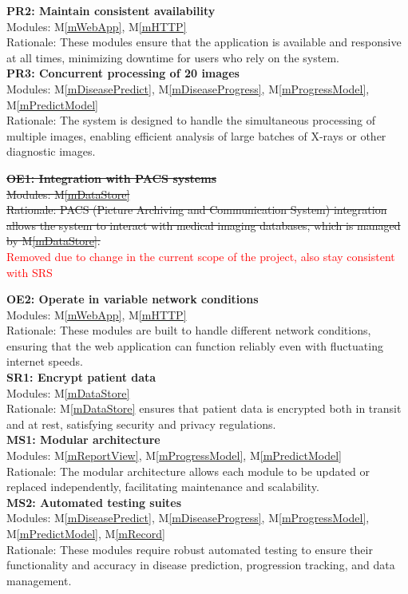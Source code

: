 \documentclass[12pt, titlepage]{article}
\newcommand{\mref}[1]{M\ref{#1}}
\begin{document}
\newline
\textbf{PR2: Maintain consistent availability} \\
Modules: \mref{mWebApp}, \mref{mHTTP} \\
Rationale: These modules ensure that the application is available and responsive at all times, minimizing downtime for users who rely on the system. \\
\newline
\textbf{PR3: Concurrent processing of 20 images} \\
Modules: \mref{mDiseasePredict}, \mref{mDiseaseProgress}, \mref{mProgressModel}, \mref{mPredictModel} \\
Rationale: The system is designed to handle the simultaneous processing of multiple images, enabling efficient analysis of large batches of X-rays or other diagnostic images. \\
\newline


\sout{\textbf{OE1: Integration with PACS systems}} \\
\sout{Modules: \mref{mDataStore}} \\
\sout{Rationale: PACS (Picture Archiving and Communication System) integration allows the system to interact with medical imaging databases, which is managed by \mref{mDataStore}.} \\
\textcolor{red}{Removed due to change in the current scope of the project, also stay consistent with SRS}


\newline
\textbf{OE2: Operate in variable network conditions} \\
Modules: \mref{mWebApp}, \mref{mHTTP} \\
Rationale: These modules are built to handle different network conditions, ensuring that the web application can function reliably even with fluctuating internet speeds. \\
\newline
\textbf{SR1: Encrypt patient data} \\
Modules: \mref{mDataStore} \\
Rationale: \mref{mDataStore} ensures that patient data is encrypted both in transit and at rest, satisfying security and privacy regulations. \\
\newline
\textbf{MS1: Modular architecture} \\
Modules: \mref{mReportView}, \mref{mProgressModel}, \mref{mPredictModel} \\
Rationale: The modular architecture allows each module to be updated or replaced independently, facilitating maintenance and scalability. \\
\newline
\textbf{MS2: Automated testing suites} \\
Modules: \mref{mDiseasePredict}, \mref{mDiseaseProgress}, \mref{mProgressModel}, \mref{mPredictModel}, \mref{mRecord} \\
Rationale: These modules require robust automated testing to ensure their functionality and accuracy in disease prediction, progression tracking, and data management. \\
\newline
\end{document}
